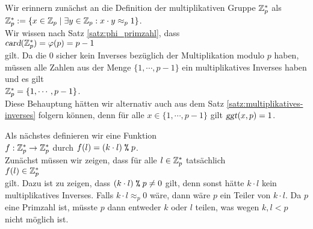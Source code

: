 \proof
Wir erinnern zun\"{a}chst an die Definition der multiplikativen Gruppe $\mathbb{Z}_{p}^*$ als
\\[0.2cm]
\hspace*{1.3cm}
$\mathbb{Z}_{p}^* := \{ x \in \mathbb{Z}_{p} \mid \exists y \in \mathbb{Z}_{p} : x \cdot y \approx_p 1 \}$.
\\[0.2cm]
Wir wissen nach Satz \ref{satz:phi_primzahl}, dass 
\\[0.2cm]
\hspace*{1.3cm}
$\textsl{card}(\mathbb{Z}_{p}^*) = \varphi(p) = p - 1$
\\[0.2cm]
gilt.  Da die $0$ sicher kein Inverses bez\"{u}glich der Multiplikation modulo $p$
haben, m\"{u}ssen alle Zahlen aus der Menge $\{1, \cdots, p-1\}$ ein multiplikatives Inverses haben und
es gilt
\\[0.2cm]
\hspace*{1.3cm}
$\mathbb{Z}_{p}^* = \{ 1, \cdots, p - 1\}$.
\\[0.2cm]
Diese Behauptung h\"{a}tten wir alternativ auch aus dem Satz \ref{satz:multiplikatives-inverses} folgern
k\"{o}nnen, denn f\"{u}r alle $x \in \{ 1, \cdots, p-1\}$ gilt $\textsl{ggt}(x, p) = 1$.

Als n\"{a}chstes definieren wir  eine Funktion
\\[0.2cm]
\hspace*{1.3cm}
$f: \mathbb{Z}_{p}^* \rightarrow \mathbb{Z}_{p}^*$ \quad durch \quad $f(l) = (k \cdot l) \;\texttt{\%}\; p$.
\\[0.2cm]
Zun\"{a}chst m\"{u}ssen wir zeigen, dass f\"{u}r alle $l \in \mathbb{Z}_{p}^*$ tats\"{a}chlich 
\\[0.2cm]
\hspace*{1.3cm}
$f(l) \in \mathbb{Z}_{p}^*$
\\[0.2cm]
gilt.  Dazu ist zu zeigen, dass $(k \cdot l) \;\texttt{\%}\; p \not= 0$ gilt, denn sonst h\"{a}tte $k \cdot l$
kein multiplikatives Inverses.  Falls $k \cdot l \approx_p 0$ w\"{a}re, dann w\"{a}re $p$ ein Teiler von $k \cdot l$.
Da $p$ eine Primzahl ist, m\"{u}sste $p$ dann entweder $k$ oder $l$ teilen, was wegen $k,l < p$ nicht
m\"{o}glich ist.

